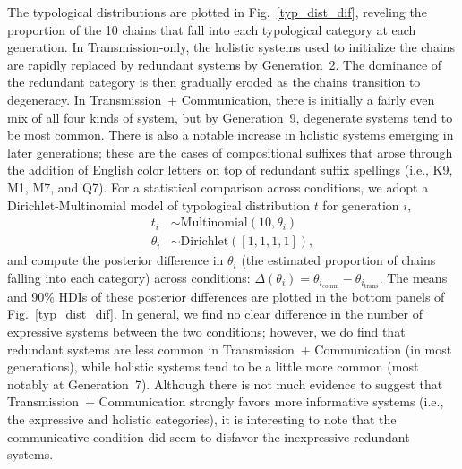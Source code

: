 \documentclass[doc,biblatex]{apa7}
\begin{document}
The typological distributions are plotted in Fig.~\ref{typ_dist_dif}, reveling the proportion of the 10 chains that fall into each typological category at each generation. In Transmission-only, the holistic systems used to initialize the chains are rapidly replaced by redundant systems by Generation~2. The dominance of the redundant category is then gradually eroded as the chains transition to degeneracy. In Transmission~+ Communication, there is initially a fairly even mix of all four kinds of system, but by Generation~9, degenerate systems tend to be most common. There is also a notable increase in holistic systems emerging in later generations; these are the cases of compositional suffixes that arose through the addition of English color letters on top of redundant suffix spellings (i.e., K9, M1, M7, and Q7). For a statistical comparison across conditions, we adopt a Dirichlet-Multinomial model of typological distribution $t$ for generation $i$,
	\begin{equation}
	\begin{aligned}
	   t_i & \sim \mathrm{Multinomial}(10, \theta_i) \\
	   \theta_i & \sim \mathrm{Dirichlet}([1, 1, 1, 1]),
	\end{aligned}
	\end{equation}
and compute the posterior difference in $\theta_i$ (the estimated proportion of chains falling into each category) across conditions: $\Delta(\theta_i) = \theta_{i_\mathrm{comm}} - \theta_{i_\mathrm{trans}}$. The means and 90\% HDIs of these posterior differences are plotted in the bottom panels of Fig.~\ref{typ_dist_dif}. In general, we find no clear difference in the number of expressive systems between the two conditions; however, we do find that redundant systems are less common in Transmission~+ Communication (in most generations), while holistic systems tend to be a little more common (most notably at Generation~7). Although there is not much evidence to suggest that Transmission~+ Communication strongly favors more informative systems (i.e., the expressive and holistic categories), it is interesting to note that the communicative condition did seem to disfavor the inexpressive redundant systems.
\end{document}
